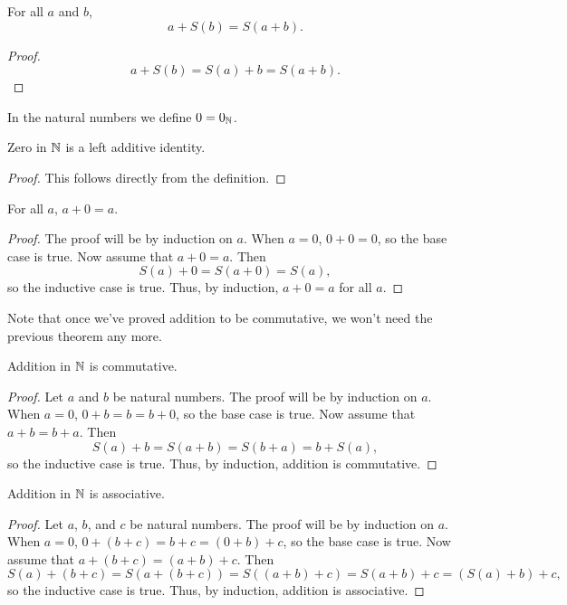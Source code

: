 \documentclass[../../math.tex]{subfiles}
\begin{document}
\begin{theorem}
    For all $a$ and $b$,
    \[
        a + S(b) = S(a + b).
    \]
\end{theorem}
\begin{proof}
    \[
        a + S(b) = S(a) + b = S(a + b).
    \]
\end{proof}

\begin{instance}
    In the natural numbers we define $0 = 0_{\mathbb{N}}$.
\end{instance}

\begin{instance}
    Zero in $\mathbb{N}$ is a left additive identity.
\end{instance}
\begin{proof}
    This follows directly from the definition.
\end{proof}

\begin{theorem}
    For all $a$, $a + 0 = a$.
\end{theorem}
\begin{proof}
    The proof will be by induction on $a$.  When $a = 0$, $0 + 0 = 0$, so the
    base case is true.  Now assume that $a + 0 = a$.  Then
    \[
        S(a) + 0 = S(a + 0) = S(a),
    \]
    so the inductive case is true.  Thus, by induction, $a + 0 = a$ for all $a$.
\end{proof}
Note that once we've proved addition to be commutative, we won't need the
previous theorem any more.

\begin{instance}
    Addition in $\mathbb{N}$ is commutative.
\end{instance}
\begin{proof}
    Let $a$ and $b$ be natural numbers.  The proof will be by induction on $a$.
    When $a = 0$, $0 + b = b = b + 0$, so the base case is true.  Now assume
    that $a + b = b + a$.  Then
    \[
        S(a) + b = S(a + b) = S(b + a) = b + S(a),
    \]
    so the inductive case is true.  Thus, by induction, addition is commutative.
\end{proof}

\begin{instance}
    Addition in $\mathbb{N}$ is associative.
\end{instance}
\begin{proof}
    Let $a$, $b$, and $c$ be natural numbers.  The proof will be by induction on
    $a$.  When $a = 0$, $0 + (b + c) = b + c = (0 + b) + c$, so the base case is
    true.  Now assume that $a + (b + c) = (a + b) + c$.  Then
    \[
        S(a) + (b + c) = S(a + (b + c)) = S((a + b) + c) = S(a + b) + c
        = (S(a) + b) + c,
    \]
    so the inductive case is true.  Thus, by induction, addition is associative.
\end{proof}
\end{document}

